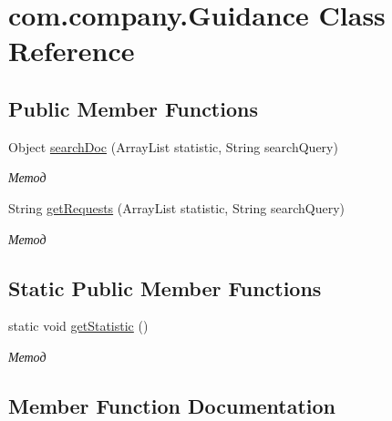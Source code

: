 \hypertarget{classcom_1_1company_1_1Guidance}{}\section{com.\+company.\+Guidance Class Reference}
\label{classcom_1_1company_1_1Guidance}
\subsection*{Public Member Functions}
\begin{DoxyCompactItemize}
\item 
Object \mbox{\hyperlink{classcom_1_1company_1_1Guidance_aa6b329f0557afeb373801df76ee960b4}{search\+Doc}} (Array\+List statistic, String search\+Query)
\begin{DoxyCompactList}\small\item\em Метод \end{DoxyCompactList}\item 
String \mbox{\hyperlink{classcom_1_1company_1_1Guidance_a67dcd7c5c935ab0177685c0fc4d23617}{get\+Requests}} (Array\+List statistic, String search\+Query)
\begin{DoxyCompactList}\small\item\em Метод \end{DoxyCompactList}\end{DoxyCompactItemize}
\subsection*{Static Public Member Functions}
\begin{DoxyCompactItemize}
\item 
static void \mbox{\hyperlink{classcom_1_1company_1_1Guidance_a9bceab5fdaf33ebf35d22523fe565f4d}{get\+Statistic}} ()
\begin{DoxyCompactList}\small\item\em Метод \end{DoxyCompactList}\end{DoxyCompactItemize}


\subsection{Member Function Documentation}
\mbox{\label{classcom_1_1company_1_1Guidance_a67dcd7c5c935ab0177685c0fc4d23617}} 

